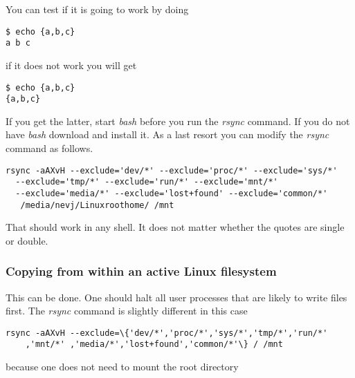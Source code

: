\documentclass{article}  %
\begin{document}
You can test if it is going to work by doing
\begin{verbatim}
$ echo {a,b,c}
a b c
\end{verbatim}
if it does not work you will get
\begin{verbatim}
$ echo {a,b,c}
{a,b,c}
\end{verbatim}
If you get the latter, start {\em bash} before you run the {\em rsync} command.
If you do not have {\em bash} download and install it.
As a last resort you can modify the {\em rsync} command as follows.
\begin{lstlisting}
rsync -aAXvH --exclude='dev/*' --exclude='proc/*' --exclude='sys/*' 
  --exclude='tmp/*' --exclude='run/*' --exclude='mnt/*'
  --exclude='media/*' --exclude='lost+found' --exclude='common/*' 
   /media/nevj/Linuxroothome/ /mnt  
\end{lstlisting}
That should work in any shell.
It does not matter whether the quotes are single or double.

\subsubsection{Copying from within an active Linux filesystem}
This can be done. One should halt all user processes that are likely to write files first. The {\em rsync} command is slightly different in this case
\begin{lstlisting}
rsync -aAXvH --exclude=\{'dev/*','proc/*','sys/*','tmp/*','run/*'
    ,'mnt/*' ,'media/*','lost+found','common/*'\} / /mnt 
\end{lstlisting}
because one does not need to mount the root directory
\end{document}
